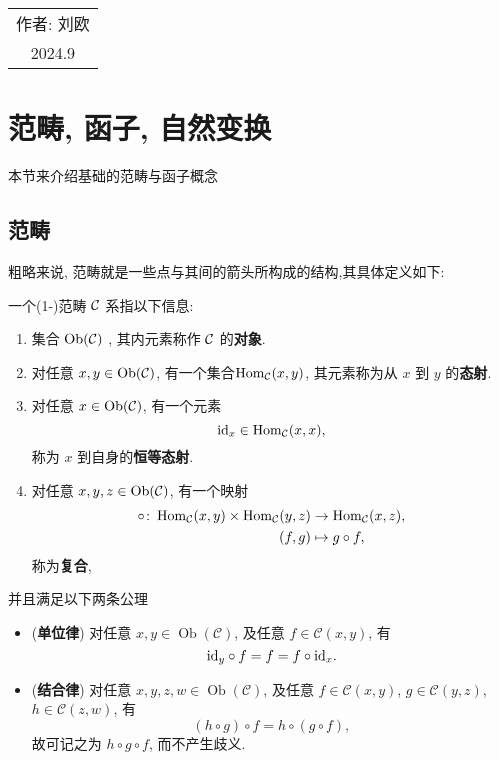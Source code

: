 \begin{flushright}\begin{minipage}{0.3 \textwidth}
	\begin{tabular}{c}
		{作者: \kaishu 刘欧} \\
		2024.9  
	\end{tabular}
\end{minipage}\end{flushright}
\section{范畴, 函子, 自然变换}

本节来介绍基础的范畴与函子概念
\subsection{范畴}
粗略来说, 范畴就是一些点与其间的箭头所构成的结构,其具体定义如下:
\begin{definition}[(1-)范畴]\label{定义:1-范畴}
    一个(1-)范畴 $\cal{C}$ 系指以下信息:
    \begin{enumerate}
        \item 集合 $\operatorname{Ob}(\cal{C})$ , 其内元素称作 $\cal{C}$ 的\textbf{对象}.
        \item 对任意 $x, y \in \operatorname{Ob} (\mathcal{C})$, 有一个集合$\operatorname{Hom}_{\mathcal{C}} (x, y)$, 其元素称为从 $x$ 到 $y$ 的\textbf{态射}.
        \item 对任意 $x \in \operatorname{Ob} (\mathcal{C})$,
            有一个元素
            \[
                \mathrm{id}_x \in \operatorname{Hom}_{\mathcal{C}} (x, x),
            \]
            称为 $x$ 到自身的\textbf{恒等态射}.
        \item 对任意 $x, y, z \in \operatorname{Ob} (\mathcal{C})$,
            有一个映射
            \begin{align*}
                \circ \colon
                \operatorname{Hom}_{\mathcal{C}} (x, y) \times \operatorname{Hom}_{\mathcal{C}} (y, z)
                & \to \operatorname{Hom}_{\mathcal{C}} (x, z), \\
                (f, g) & \mapsto g \circ f,
            \end{align*}
            称为\textbf{复合},
    \end{enumerate}
    并且满足以下两条公理
     \begin{itemize}
        \item
            (\textbf{单位律})
            对任意 $x, y \in \operatorname{Ob} (\mathcal{C})$,
            及任意 $f \in \mathcal{C} (x, y)$, 有
            \[
                \mathrm{id}_y \circ f = f = f \circ \mathrm{id}_x.
            \]
        \item
            (\textbf{结合律})
            对任意 $x, y, z, w \in \operatorname{Ob} (\mathcal{C})$,
            及任意 $f \in \mathcal{C} (x, y)$,
            $g \in \mathcal{C} (y, z)$, 
            $h \in \mathcal{C} (z, w)$, 有
            \[
                (h \circ g) \circ f = h \circ (g \circ f),
            \]
            故可记之为 $h \circ g \circ f$, 而不产生歧义.
    \end{itemize}
\end{definition}
